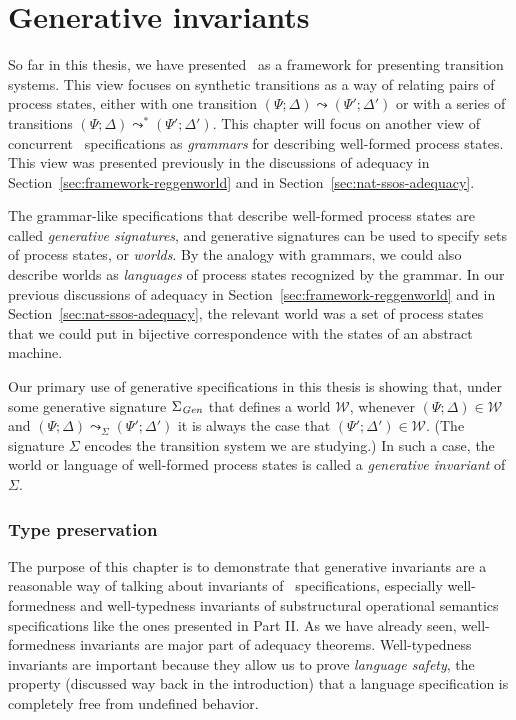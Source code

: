 \chapter{Generative invariants}
\label{chapter-gen}

So far in this thesis, we have presented \sls~as a framework for
presenting transition systems. This view focuses on synthetic
transitions as a way of relating pairs of process states, either with
one transition $(\Psi; \Delta) \leadsto (\Psi'; \Delta')$ or with a
series of transitions $(\Psi; \Delta) \leadsto^* (\Psi';
\Delta')$. This chapter will focus on another view of concurrent
\sls~specifications as {\it grammars} for describing well-formed
process states. This view was presented previously in the discussions
of adequacy in Section~\ref{sec:framework-reggenworld} and in
Section~\ref{sec:nat-ssos-adequacy}.

The grammar-like specifications that describe well-formed process
states are called {\it generative signatures}, and generative
signatures can be used to specify sets of process states, or {\it
  worlds}. By the analogy with grammars, we could also describe worlds
as {\it languages} of process states recognized by the grammar. In our
previous discussions of adequacy in
Section~\ref{sec:framework-reggenworld} and in
Section~\ref{sec:nat-ssos-adequacy}, the relevant world was a set of
process states that we could put in bijective correspondence with the
states of an abstract machine.

Our primary use of generative specifications in this thesis is showing
that, under some generative signature $\Sigma_{\it Gen}$ that defines
a world $\mathcal W$, whenever $(\Psi; \Delta) \in \mathcal W$ and
$(\Psi; \Delta) \leadsto_\Sigma (\Psi'; \Delta')$ it is always the
case that $(\Psi'; \Delta') \in \mathcal W$.  (The signature $\Sigma$
encodes the transition system we are studying.)  In such a case, the
world or language of well-formed process states is called a {\it
  generative invariant} of $\Sigma$.

\subsection*{Type preservation}

The purpose of this chapter is to demonstrate that generative
invariants are a reasonable way of talking about invariants of
\sls~specifications, especially well-formedness and well-typedness
invariants of substructural operational semantics specifications like
the ones presented in Part II. As we have already
seen, well-formedness invariants are major part of adequacy
theorems. Well-typedness invariants are important because they allow us to
prove {\it language safety}, the property (discussed way back in the
introduction) that a language specification is completely free
from undefined behavior.

